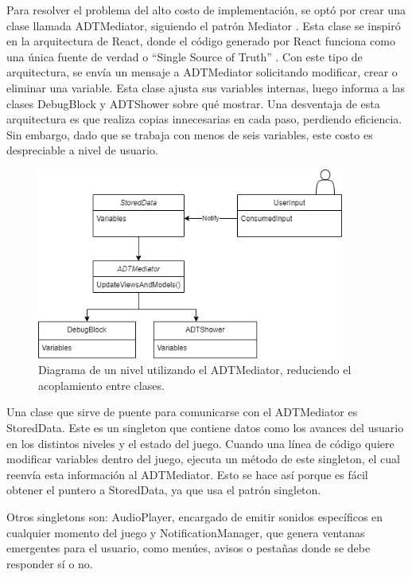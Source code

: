Para resolver el problema del alto costo de implementación, se optó por crear una clase llamada ADTMediator, siguiendo el patrón Mediator \cite{Freeman2015TheMP}. Esta clase se inspiró en la arquitectura de React, donde el código generado por React funciona como una única fuente de verdad o ``Single Source of Truth'' \cite{ReactSingleSourceOfTruth}. Con este tipo de arquitectura, se envía un mensaje a ADTMediator solicitando modificar, crear o eliminar una variable. Esta clase ajusta sus variables internas, luego informa a las clases DebugBlock y ADTShower sobre qué mostrar. Una desventaja de esta arquitectura es que realiza copias innecesarias en cada paso, perdiendo eficiencia. Sin embargo, dado que se trabaja con menos de seis variables, este costo es despreciable a nivel de usuario.

\begin{figure}[h!]
	\centering
	\includegraphics[width=0.9\textwidth]{imagenes/ArquitecturaMediatorAfter.png}
	\caption{Diagrama de un nivel utilizando el ADTMediator, reduciendo el acoplamiento entre clases.}
	\label{ArquitecturaMediatorAfter}
\end{figure}

Una clase que sirve de puente para comunicarse con el ADTMediator es StoredData. Este es un singleton que contiene datos como los avances del usuario en los distintos niveles y el estado del juego. Cuando una línea de código quiere modificar variables dentro del juego, ejecuta un método de este singleton, el cual reenvía esta información al ADTMediator. Esto se hace así porque es fácil obtener el puntero a StoredData, ya que usa el patrón singleton.

Otros singletons son: AudioPlayer, encargado de emitir sonidos específicos en cualquier momento del juego y NotificationManager, que genera ventanas emergentes para el usuario, como menúes, avisos o pestañas donde se debe responder sí o no.

